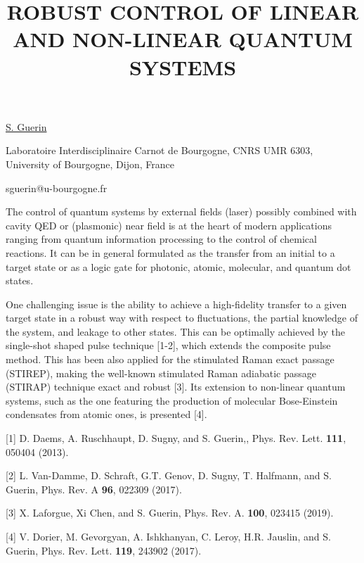 \title{ROBUST CONTROL OF LINEAR AND NON-LINEAR QUANTUM SYSTEMS}

\underline{S. Guerin} 

{\normalsize{\vspace{-4mm}
Laboratoire Interdisciplinaire Carnot de Bourgogne, CNRS UMR 6303, University of Bourgogne, Dijon, France 



\email sguerin@u-bourgogne.fr}}

The control of quantum systems by external fields (laser) possibly combined with cavity QED or (plasmonic) near field is at the heart of modern applications ranging from quantum information processing to the control of chemical reactions.  It can be in general formulated as the transfer from an initial to a target state or as a logic gate for photonic, atomic, molecular, and quantum dot states.

One challenging issue is the ability to achieve a high-fidelity transfer to a given target state in a robust way with respect to fluctuations, the partial knowledge of the system, and leakage to other states. This can be optimally achieved by the single-shot shaped pulse technique [1-2], which extends the composite pulse method. This has been also applied for the stimulated Raman exact passage (STIREP), making the well-known stimulated Raman adiabatic passage (STIRAP) technique exact and robust [3].
Its extension to non-linear quantum systems, such as the one featuring the production of molecular Bose-Einstein condensates from atomic ones, is presented [4].


{\normalsize
[1] D. Daems, A. Ruschhaupt, D. Sugny, and S. Guerin,, Phys. Rev. Lett. \textbf{111}, 050404 (2013).
\vsp

[2] L. Van-Damme, D. Schraft, G.T. Genov, D. Sugny, T. Halfmann, and S. Guerin, Phys. Rev. A \textbf{96}, 022309 (2017).
\vsp

[3] X. Laforgue, Xi Chen, and S. Guerin, Phys. Rev. A. \textbf{100}, 023415 (2019).
\vsp

[4] V. Dorier, M. Gevorgyan, A. Ishkhanyan, C. Leroy, H.R. Jauslin, and S. Guerin, Phys. Rev. Lett. \textbf{119}, 243902 (2017).
}

\vspace{\baselineskip}